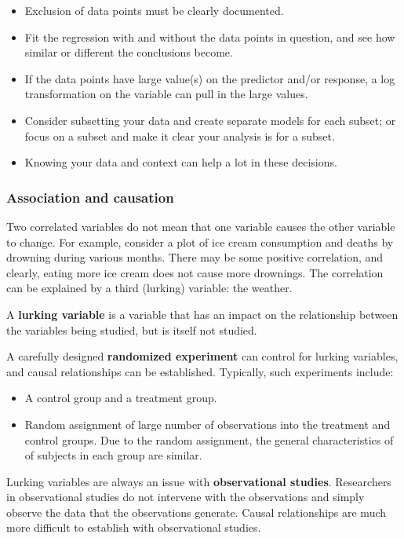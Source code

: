 \documentclass[
]{book}
\providecommand{\tightlist}{%
  \setlength{\itemsep}{0pt}\setlength{\parskip}{0pt}}
\begin{document}
\begin{itemize}
\tightlist
\item
  Exclusion of data points must be clearly documented.
\item
  Fit the regression with and without the data points in question, and see how similar or different the conclusions become.
\item
  If the data points have large value(s) on the predictor and/or response, a log transformation on the variable can pull in the large values.
\item
  Consider subsetting your data and create separate models for each subset; or focus on a subset and make it clear your analysis is for a subset.
\item
  Knowing your data and context can help a lot in these decisions.
\end{itemize}

\subsubsection{Association and causation}\label{association-and-causation}

Two correlated variables do not mean that one variable causes the other variable to change. For example, consider a plot of ice cream consumption and deaths by drowning during various months. There may be some positive correlation, and clearly, eating more ice cream does not cause more drownings. The correlation can be explained by a third (lurking) variable: the weather.

A \textbf{lurking variable} is a variable that has an impact on the relationship between the variables being studied, but is itself not studied.

A carefully designed \textbf{randomized experiment} can control for lurking variables, and causal relationships can be established. Typically, such experiments include:

\begin{itemize}
\tightlist
\item
  A control group and a treatment group.
\item
  Random assignment of large number of observations into the treatment and control groups. Due to the random assignment, the general characteristics of of subjects in each group are similar.
\end{itemize}

Lurking variables are always an issue with \textbf{observational studies}. Researchers in observational studies do not intervene with the observations and simply observe the data that the observations generate. Causal relationships are much more difficult to establish with observational studies.
\end{document}
